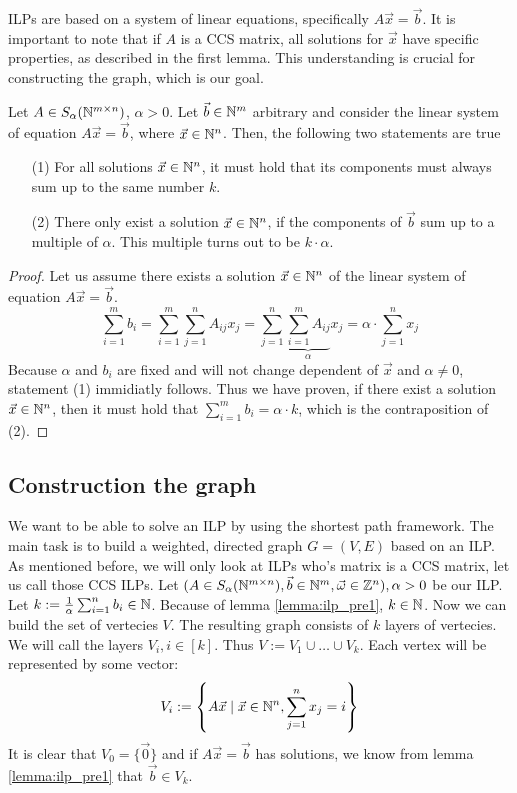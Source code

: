 ILPs are based on a system of linear equations, specifically $A \vec{x} = \vec{b}$. It is important to note that if $A$ is a CCS matrix, all solutions for $\vec{x}$ have specific properties, as described in the first lemma. This understanding is crucial for constructing the graph, which is our goal.

\begin{lemma}
    \label{lemma:ilp_pre1}
    Let $A\in S_\alpha(\mathbb{N}^{m \times n})$, $\alpha > 0$. Let $\vec b \in \mathbb{N}^m$ arbitrary and consider the linear system of equation $A\vec x=\vec b$, where $\vec x \in \mathbb{N}^n$. Then, the following two statements are true

    \begin{enumerate}
        \item[(1)] For all solutions $\vec x \in \mathbb{N}^n$, it must hold that its components must always sum up to the same number $k$.
        \item[(2)] There only exist a solution $\vec x \in \mathbb{N}^n$, if the components of $\vec b$ sum up to a multiple of $\alpha$. This multiple turns out to be $k \cdot \alpha$.
    \end{enumerate}
\end{lemma}

\begin{proof}
    Let us assume there exists a solution $\vec x \in \mathbb{N}^n$ of the linear system of equation $A\vec x=\vec b$.
    $$\sum_{i=1}^m b_i = \sum_{i=1}^{m}\sum_{j=1}^{n}A_{ij} x_j = \sum_{j=1}^{n}\underbrace{\sum_{i=1}^{m}A_{ij}}_\alpha x_j = \alpha \cdot \sum_{j=1}^{n}x_j$$
    Because $\alpha$ and $b_i$ are fixed and will not change dependent of $\vec x$ and $\alpha \neq 0$, statement (1) immidiatly follows. Thus we have proven, if there exist a solution $\vec x \in \mathbb{N}^n$, then it must hold that $\sum_{i=1}^{m}b_i = \alpha \cdot k$, which is the contraposition of (2).
\end{proof}


\subsection{Construction the graph}
\label{chap:graph_constrition}
We want to be able to solve an ILP by using the shortest path framework. The main task is to build a weighted, directed graph $G = (V, E)$ based on an ILP. As mentioned before, we will only look at ILPs who's matrix is a CCS matrix, let us call those CCS ILPs. Let $(A \in S_\alpha(\mathbb{N}^{m \times n}), \vec b \in \mathbb{N}^m, \vec\omega \in \mathbb{Z}^n), \alpha > 0$ be our ILP. Let $k := \frac{1}{\alpha} \sum_{i=1}^{n}b_i \in \mathbb{N}$. Because of lemma \ref{lemma:ilp_pre1}, $k \in \mathbb{N}$. Now we can build the set of vertecies $V$. The resulting graph consists of $k$ layers of vertecies. We will call the layers $V_i, i \in [k]$. Thus $V := V_1 \cup \dots \cup V_k$. Each vertex will be represented by some vector:
$$V_i := \left\{A\vec x \mid \vec x \in \mathbb{N}^n, \sum_{j=1}^{n} x_j = i \right\}$$ 
It is clear that $V_0 = \{\vec 0\}$ and if $A\vec x = \vec b$ has solutions, we know from lemma \ref{lemma:ilp_pre1} that $\vec b \in V_k$. 

